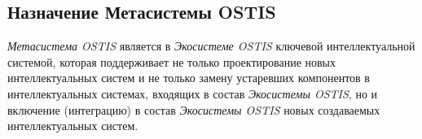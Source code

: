 \subsection{Назначение Метасистемы OSTIS}
\label{ims_purpose}

\textit{Метасистема OSTIS} является в \textit{Экосистеме OSTIS} ключевой интеллектуальной системой, которая поддерживает не только проектирование новых интеллектуальных систем и не только замену устаревших компонентов в интеллектуальных системах, входящих в состав \textit{Экосистемы OSTIS}, но и включение (интеграцию) в состав \textit{Экосистемы OSTIS} новых создаваемых интеллектуальных систем.

